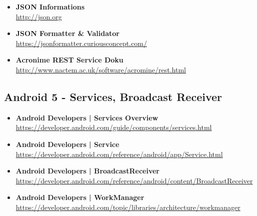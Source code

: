 \documentclass[a4paper]{article}
\begin{document}
\begin{itemize}
		\item \textbf{JSON Informations}\\
		\href{http://json.org}
		{http://json.org}
		
		\item \textbf{JSON Formatter \& Validator}\\
		\href{https://jsonformatter.curiousconcept.com/}
		{https://jsonformatter.curiousconcept.com/}
		
		\item \textbf{Acronime REST Service Doku}\\
		\href{http://www.nactem.ac.uk/software/acromine/rest.html}
		{http://www.nactem.ac.uk/software/acromine/rest.html}
		
	\end{itemize}
	
	\subsection{Android 5 - Services, Broadcast Receiver}
	
	\begin{itemize}
		
		\item \textbf{Android Developers | Services Overview}\\
		\href{https://developer.android.com/guide/components/services.html}
		{https://developer.android.com/guide/components/services.html}
		
		\item \textbf{Android Developers | Service}\\
		\href{https://developer.android.com/reference/android/app/Service.html}
		{https://developer.android.com/reference/android/app/Service.html}		
		
		\item \textbf{Android Developers | BroadcastReceiver}\\
		\href{https://developer.android.com/reference/android/content/BroadcastReceiver}
		{https://developer.android.com/reference/android/content/BroadcastReceiver}	
		
		\item \textbf{Android Developers | WorkManager}\\
		\href{https://developer.android.com/topic/libraries/architecture/workmanager}
		{https://developer.android.com/topic/libraries/architecture/workmanager}			
		
	\end{itemize}
	
\end{document}

